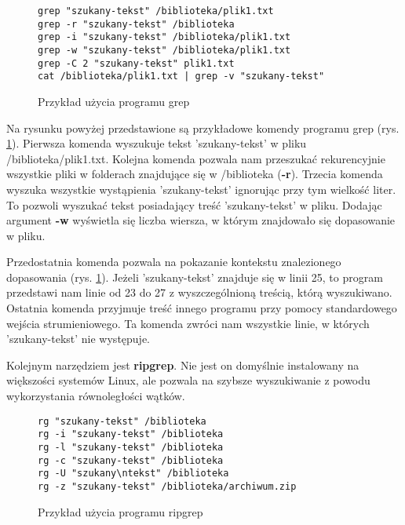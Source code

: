 \begin{figure}[htbp]
  \centering
\begin{tcolorbox}[
    colback=white,
    colframe=black,
    boxrule=0.5pt,
    arc=0pt
]
  \begin{verbatim}
grep "szukany-tekst" /biblioteka/plik1.txt 
grep -r "szukany-tekst" /biblioteka 
grep -i "szukany-tekst" /biblioteka/plik1.txt
grep -w "szukany-tekst" /biblioteka/plik1.txt
grep -C 2 "szukany-tekst" plik1.txt
cat /biblioteka/plik1.txt | grep -v "szukany-tekst" 
  \end{verbatim}
\end{tcolorbox}
\caption{Przykład użycia programu grep}
\label{fig:cmd:grepExamples}
\end{figure}

Na rysunku powyżej przedstawione są przykładowe komendy programu grep 
(rys. \ref{fig:cmd:grepExamples}). Pierwsza komenda wyszukuje tekst 'szukany-tekst' w pliku /biblioteka/plik1.txt.
Kolejna komenda pozwala nam przeszukać rekurencyjnie wszystkie pliki w folderach znajdujące się w 
/biblioteka (\textbf{-r}). Trzecia komenda wyszuka wszystkie wystąpienia 
'szukany-tekst' ignorując przy tym wielkość liter. To pozwoli wyszukać tekst
posiadający treść 'szukany-tekst' w pliku. Dodając argument \textbf{-w}
wyświetla się liczba wiersza, w którym znajdowało się dopasowanie w pliku. 

Przedostatnia komenda pozwala na pokazanie kontekstu znalezionego dopasowania 
(rys. \ref{fig:cmd:grepExamples}). Jeżeli 'szukany-tekst' znajduje się w linii 25, to
program przedstawi nam linie od 23 do 27 z wyszczególnioną treścią, którą 
wyszukiwano. Ostatnia komenda przyjmuje treść innego programu przy pomocy
standardowego wejścia strumieniowego. Ta komenda zwróci nam wszystkie linie,
w których 'szukany-tekst' nie występuje.

Kolejnym narzędziem jest \textbf{ripgrep}. Nie jest on domyślnie instalowany na 
większości systemów Linux, ale pozwala na szybsze wyszukiwanie z powodu
wykorzystania równoległości wątków.

\begin{figure}[htbp]
  \centering
\begin{tcolorbox}[
    colback=white,
    colframe=black,
    boxrule=0.5pt,
    arc=0pt
]
  \begin{verbatim}
rg "szukany-tekst" /biblioteka
rg -i "szukany-tekst" /biblioteka
rg -l "szukany-tekst" /biblioteka
rg -c "szukany-tekst" /biblioteka
rg -U "szukany\ntekst" /biblioteka
rg -z "szukany-tekst" /biblioteka/archiwum.zip
  \end{verbatim}
\end{tcolorbox}
\caption{Przykład użycia programu ripgrep}
\label{fig:cmd:ripgrepExamples}
\end{figure}

